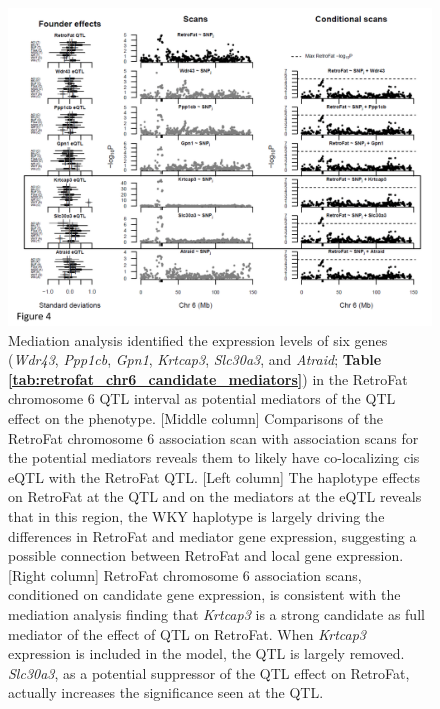 \begin{figure}
\centering
\includegraphics[trim={0in 0.3in 0in 0in}, clip, width=\textwidth]{figures/5-hsrats/Figure4.pdf}
\caption[Co-localizing eQTL and their effect on the QTL association with RetroFat when included in the model]{Mediation analysis identified the expression levels of six genes (\textit{Wdr43}, \textit{Ppp1cb}, \textit{Gpn1}, \textit{Krtcap3}, \textit{Slc30a3}, and \textit{Atraid}; \textbf{Table \ref{tab:retrofat_chr6_candidate_mediators}}) in the RetroFat chromosome 6 QTL interval as potential mediators of the QTL effect on the phenotype. [Middle column] Comparisons of the RetroFat chromosome 6 association scan with association scans for the potential mediators reveals them to likely have co-localizing cis eQTL with the RetroFat QTL. [Left column] The haplotype effects on RetroFat at the QTL and on the mediators at the eQTL reveals that in this region, the WKY haplotype is largely driving the differences in RetroFat and mediator gene expression, suggesting a possible connection between RetroFat and local gene expression. [Right column] RetroFat chromosome 6 association scans, conditioned on candidate gene expression, is consistent with the mediation analysis finding that \textit{Krtcap3} is a strong candidate as full mediator of the effect of QTL on RetroFat. When \textit{Krtcap3} expression is included in the model, the QTL is largely removed. \textit{Slc30a3}, as a potential suppressor of the QTL effect on RetroFat, actually increases the significance seen at the QTL. \label{fig:mediation_analysis}}
\end{figure}


